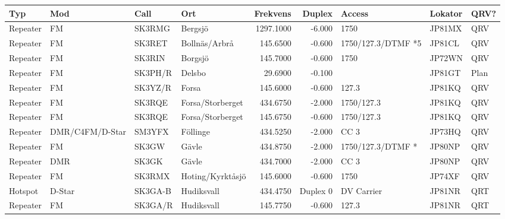 \begin{landscape}
\begin{longtable}{llllrrlll}
	\bf Typ           & \bf Mod         & \bf Call & \bf Ort             & \bf Frekvens & \bf Duplex & \bf Access         & \bf Lokator & \bf QRV? \\ \hline
	\endhead
Repeater & FM              & SK3RMG   & Bergsjö             &    1297.1000 &     -6.000 & 1750               & JP81MX      & QRV      \\
	Repeater          & FM              & SK3RET   & Bollnäs/Arbrå       &     145.6500 &     -0.600 & 1750/127.3/DTMF *5 & JP81CL      & QRV      \\
	Repeater          & FM              & SK3RIN   & Borgsjö             &     145.7000 &     -0.600 & 1750               & JP72WN      & QRV      \\
	Repeater          & FM              & SK3PH/R  & Delsbo              &      29.6900 &     -0.100 &                    & JP81GT      & Plan     \\
	Repeater          & FM              & SK3YZ/R  & Forsa               &     145.6000 &     -0.600 & 127.3              & JP81KQ      & QRV      \\
	Repeater          & FM              & SK3RQE   & Forsa/Storberget    &     434.6750 &     -2.000 & 1750/127.3         & JP81KQ      & QRV      \\
	Repeater          & FM              & SK3RQE   & Forsa/Storberget    &     145.6750 &     -0.600 & 1750/127.3         & JP81KQ      & QRV      \\
	Repeater          & DMR/C4FM/D-Star & SM3YFX   & Föllinge            &     434.5250 &     -2.000 & CC 3               & JP73HQ      & QRV      \\
	Repeater          & FM              & SK3GW    & Gävle               &     434.8750 &     -2.000 & 1750/127.3/DTMF *  & JP80NP      & QRV      \\
	Repeater          & DMR             & SK3GK    & Gävle               &     434.7000 &     -2.000 & CC 3               & JP80NP      & QRV      \\
	Repeater          & FM              & SK3RMX   & Hoting/Kyrktåsjö    &     145.6000 &     -0.600 & 1750               & JP74XF      & QRV      \\
	Hotspot           & D-Star          & SK3GA-B  & Hudiksvall          &     434.4750 &   Duplex 0 & DV Carrier         & JP81NR      & QRT      \\
	Repeater          & FM              & SK3GA/R  & Hudiksvall          &     145.7750 &     -0.600 & 127.3              & JP81NR      & QRT      \\

\end{longtable}
\end{landscape}
